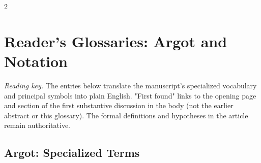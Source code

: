 \documentclass[10pt,letterpaper]{article}
\theoremstyle{definition}
\theoremstyle{remark}
\begin{document}
\begin{multicols}{2}
\small\tableofcontents
\end{multicols}
\newpage
\clearpage
\section*{Reader's Glossaries: Argot and Notation}
\noindent\emph{Reading key.} The entries below translate the manuscript's specialized vocabulary and principal symbols into plain English. "First found" links to the opening page and section of the first substantive discussion in the body (not the earlier abstract or this glossary). The formal definitions and hypotheses in the article remain authoritative.
\subsection*{Argot: Specialized Terms}
\begingroup\small\setlength{\tabcolsep}{4pt}\renewcommand{\arraystretch}{1.16}
\end{document}
